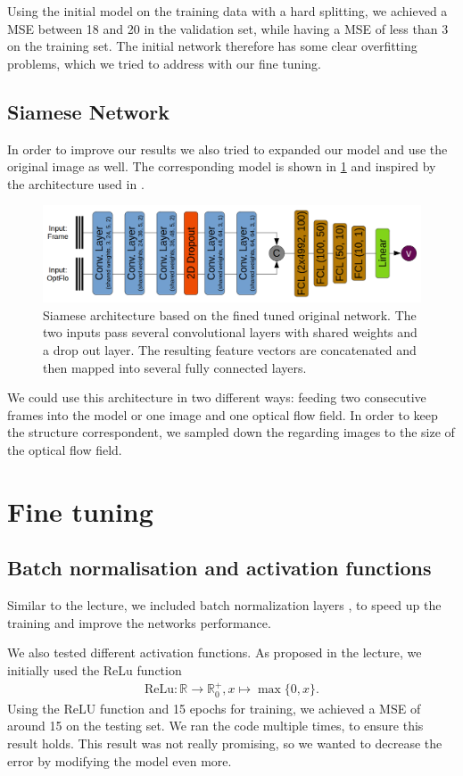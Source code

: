 \documentclass[conference]{IEEEtran}
\begin{document}
Using the initial model on the training data with a hard splitting, we achieved a MSE between 18 and 20 
in the validation set, while having a MSE of less than 3 on the training set. The initial network 
therefore has some clear overfitting problems, which we tried to address with our fine tuning.

\subsection{Siamese Network}

In order to improve our results we also tried to expanded our model and use the original image as well. The corresponding model is shown in \cref{fig:siameseNetwork} and inspired by the architecture used in
\cite{Wang2017}.

\begin{figure}[ht]
	\centering
	\includegraphics[width=0.9\columnwidth]{imgs/siamese_model.png}
	\caption{Siamese architecture based on the fined tuned original network. The two inputs pass 
	several convolutional layers with shared weights and a drop out layer. The resulting
	feature vectors are concatenated and then mapped into several fully connected layers.}
	\label{fig:siameseNetwork}
\end{figure}
We could use this architecture in two different ways: feeding two consecutive frames into the model or one image and one optical flow field. In order to keep the structure correspondent, we sampled down the regarding images to the size of the optical flow field.

\section{Fine tuning}

\subsection{Batch normalisation and activation functions}
Similar to the lecture, we included batch normalization layers \cite{BatchNorm2015}, to speed up
the training and improve the networks performance.

We also tested different activation functions. As proposed in the lecture, we initially used the ReLu
function
\begin{align*}
\mathrm{ReLu}: \mathbb{R} \to \mathbb{R}_0^+, x \mapsto \max\{0,x\}.
\end{align*}
Using the ReLU function and 15 epochs for training, we achieved a MSE of around 15 on the 
testing set. We ran the code multiple times, to ensure this result holds. This result was not really 
promising, so we wanted to decrease the error by modifying the model even more.
\end{document}
